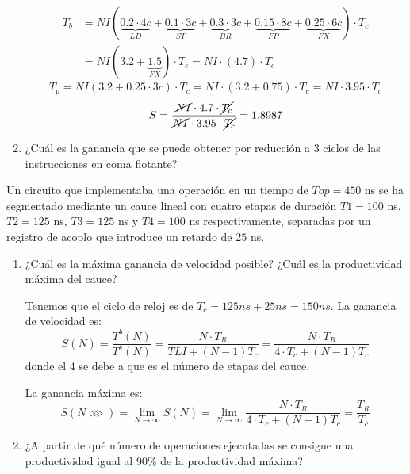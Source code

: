 \begin{ejercicio}
\begin{enumerate}
        \begin{align*}
            T_b &= NI  (\underbrace{0.2\cdot 4c}_{LD}+\underbrace{0.1\cdot 3c}_{ST}+ \underbrace{0.3\cdot 3c}_{BR} + \underbrace{0.15 \cdot 8c}_{FP} + \underbrace{0.25 \cdot 6c}_{FX} ) \cdot T_c\\
             &= NI (3.2 +\underbrace{1.5}_{FX}) \cdot T_c = NI \cdot (4.7) \cdot T_c
        \end{align*}
        \begin{equation*}
            T_p = NI(3.2+0.25 \cdot 3c) \cdot T_c = NI \cdot (3.2+0.75)\cdot T_c = NI \cdot 3.95 \cdot T_c
        \end{equation*}
        \begin{equation*}
            S = \dfrac{\cancel{NI} \cdot 4.7 \cdot \cancel{T_c}}{\cancel{NI} \cdot 3.95 \cdot \cancel{T_c}} = 1.8987
        \end{equation*}

        \item ¿Cuál es la ganancia que se puede obtener por reducción a 3 ciclos de las instrucciones en coma flotante?
    \end{enumerate}
\end{ejercicio}

\begin{ejercicio}
    Un circuito que implementaba una operación en un tiempo de $Top=450$ ns se ha segmentado
    mediante un cauce lineal con cuatro etapas de duración $T1=100$ ns, $T2=125$ ns, $T3=125$ ns y
    $T4=100$ ns respectivamente, separadas por un registro de acoplo que introduce un retardo de
    $25$ ns.
    \begin{enumerate}
        \item ¿Cuál es la máxima ganancia de velocidad posible? ¿Cuál es la productividad máxima
        del cauce?

        Tenemos que el ciclo de reloj es de $T_c = 125ns + 25ns = 150ns$. La ganancia de velocidad es:
        $$
        S(N) = \frac{T^b(N)}{T^s(N)} = \frac{N\cdot T_R}{TLI + (N-1)T_c}
        = \frac{N\cdot T_R}{4\cdot T_c + (N-1)T_c}
        $$
        donde el 4 se debe a que es el número de etapas del cauce.

        La ganancia máxima es:
        $$
        S(N\ggg) = \lim_{N\to\infty} S(N) = \lim_{N\to\infty} \frac{N\cdot T_R}{4\cdot T_c + (N-1)T_c} = \frac{T_R}{T_c}
        $$

        \item ¿A partir de qué número de operaciones ejecutadas se consigue una productividad igual
        al 90\% de la productividad máxima?
    \end{enumerate}
\end{ejercicio}


